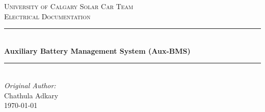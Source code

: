   \begin{titlepage}
  
    \newcommand{\HRule}{\rule{\linewidth}{0.5mm}} %
    
    \center %
     
    
    \textsc{\LARGE University of Calgary Solar Car Team}\\[1.5cm] %
    \textsc{\Large Electrical Documentation}\\[0.5cm] %
    
    
    \HRule \\[0.4cm]
      { \huge \bfseries Auxiliary Battery Management System (Aux-BMS)}\\[0.4cm] %
    \HRule \\[1.5cm]
     
    
    \Large \emph{Original Author:}\\
    Chathula Adkary \\[3cm] %
    
    
    {\large \today}\\[2cm] %
    
    

\end{titlepage}
